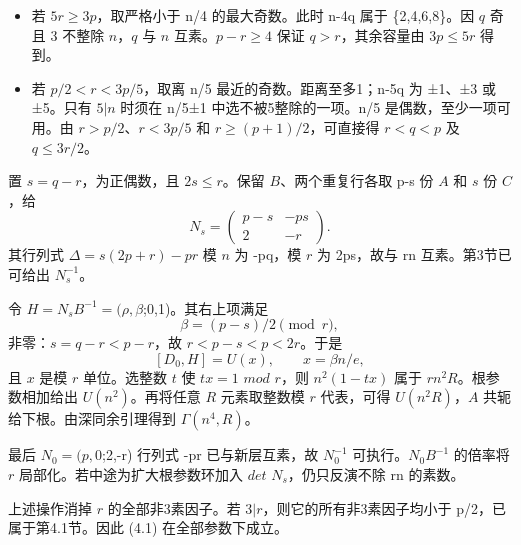 \documentclass[11pt,a4paper]{article}
\newcommand{\tightlist}{\setlength{\itemsep}{0pt}\setlength{\parskip}{0pt}}
\theoremstyle{definition}
\numberwithin{equation}{section}
\begin{document}
\begin{itemize}
\tightlist
\item
  {若} {\ensuremath{5r\ge 3p}，取严格小于} {n/4} {的最大奇数。此时} {n-4q} {属于} {\{2,4,6,8\}。因} {\ensuremath{q}} {奇且} {3} {不整除} {\ensuremath{n}，\ensuremath{q}} {与} {\ensuremath{n}} {互素。\ensuremath{p-r\ge 4}} {保证} {\ensuremath{q>r}，其余容量由} {\ensuremath{3p\le 5r}} {得到。}
\item
  {若} {\ensuremath{p/2<r<3p/5}，取离} {n/5} {最近的奇数。距离至多1；n-5q} {为} {±1、±3} {或} {±5。只有} {\ensuremath{5|n}} {时须在} {n/5±1} {中选不被5整除的一项。n/5} {是偶数，至少一项可用。由} {\ensuremath{r>p/2}、\ensuremath{r<3p/5}} {和} {\ensuremath{r\ge (p+1)/2}，可直接得} {\ensuremath{r<q<p}} {及} {\ensuremath{q\le 3r/2}。}
\end{itemize}

{置} {\ensuremath{s=q-r}，为正偶数，且} {\ensuremath{2s\le r}。保留} {\ensuremath{B}、两个重复行各取} {p-s} {份} {\ensuremath{A}} {和} {\ensuremath{s}} {份} {\ensuremath{C}，给} \[
N_s=\begin{pmatrix}p-s&-ps\\2&-r\end{pmatrix}.
\] {其行列式} {\ensuremath{\Delta =s(2p+r)-pr}} {模} {\ensuremath{n}} {为} {-pq，模} {\ensuremath{r}} {为} {2ps，故与} {rn} {互素。第3节已可给出} {\ensuremath{N_{s}^{-1}}。}

{令} {\ensuremath{H=N_{s}B^{-1}=(\rho ,\beta };0,1)。其右上项满足} \[
\beta=(p-s)/2\pmod r,
\] {非零：\ensuremath{s=q-r<p-r}，故} {\ensuremath{r<p-s<p<2r}。于是} \[
[D_0,H]=U(x),\qquad x=\beta n/e,
\tag{C26.4.6}
\] {且} {\ensuremath{x}} {是模} {\ensuremath{r}} {单位。选整数} {\ensuremath{t}} {使} {\ensuremath{tx=1}} {\ensuremath{mod}} {\ensuremath{r}，则} {\ensuremath{n^{2}(1-tx)}} {属于} {\ensuremath{rn^{2}R}。根参数相加给出} {\ensuremath{U(n^{2})}。再将任意} {\ensuremath{R}} {元素取整数模} {\ensuremath{r}} {代表，可得} {\ensuremath{U(n^{2}R)}，\ensuremath{A}} {共轭给下根。由深同余引理得到} {\ensuremath{\Gamma (n^{4},R)}。}

{最后} {\ensuremath{N_{0}=(p,0};2,-r)} {行列式} {-pr} {已与新层互素，故} {\ensuremath{N_{0}^{-1}}} {可执行。\ensuremath{N_{0}B^{-1}}} {的倍率将} {\ensuremath{r}} {局部化。若中途为扩大根参数环加入} {\ensuremath{det}} {\ensuremath{N_{s}}，仍只反演不除} {rn} {的素数。}

{上述操作消掉} {\ensuremath{r}} {的全部非3素因子。若} {\ensuremath{3|r}，则它的所有非3素因子均小于} {p/2，已属于第4.1节。因此} {(4.1)} {在全部参数下成立。}
\end{document}
